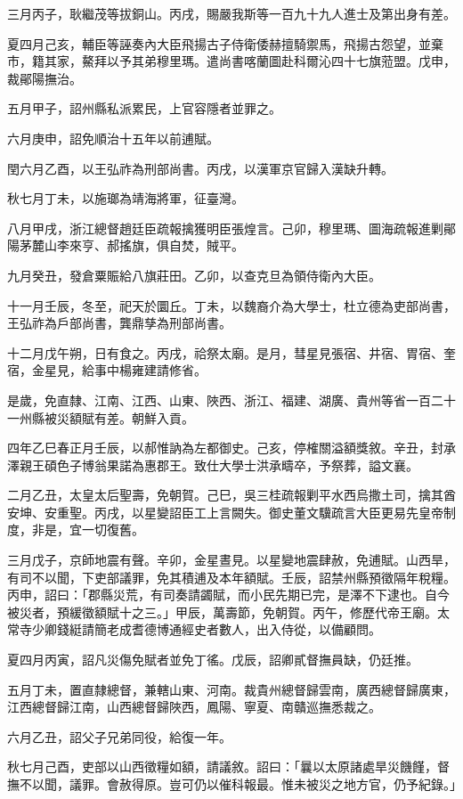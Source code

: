 \begin{pinyinscope}
三月丙子，耿繼茂等拔銅山。丙戌，賜嚴我斯等一百九十九人進士及第出身有差。

夏四月己亥，輔臣等誣奏內大臣飛揚古子侍衛倭赫擅騎禦馬，飛揚古怨望，並棄市，籍其家，鰲拜以予其弟穆里瑪。遣尚書喀蘭圖赴科爾沁四十七旗蒞盟。戊申，裁鄖陽撫治。

五月甲子，詔州縣私派累民，上官容隱者並罪之。

六月庚申，詔免順治十五年以前逋賦。

閏六月乙酉，以王弘祚為刑部尚書。丙戌，以漢軍京官歸入漢缺升轉。

秋七月丁未，以施瑯為靖海將軍，征臺灣。

八月甲戌，浙江總督趙廷臣疏報擒獲明臣張煌言。己卯，穆里瑪、圖海疏報進剿鄖陽茅麓山李來亨、郝搖旗，俱自焚，賊平。

九月癸丑，發倉粟賑給八旗莊田。乙卯，以查克旦為領侍衛內大臣。

十一月壬辰，冬至，祀天於圜丘。丁未，以魏裔介為大學士，杜立德為吏部尚書，王弘祚為戶部尚書，龔鼎孳為刑部尚書。

十二月戊午朔，日有食之。丙戌，祫祭太廟。是月，彗星見張宿、井宿、胃宿、奎宿，金星見，給事中楊雍建請修省。

是歲，免直隸、江南、江西、山東、陜西、浙江、福建、湖廣、貴州等省一百二十一州縣被災額賦有差。朝鮮入貢。

四年乙巳春正月壬辰，以郝惟訥為左都御史。己亥，停榷關溢額獎敘。辛丑，封承澤親王碩色子博翁果諾為惠郡王。致仕大學士洪承疇卒，予祭葬，謚文襄。

二月乙丑，太皇太后聖壽，免朝賀。己巳，吳三桂疏報剿平水西烏撒土司，擒其酋安坤、安重聖。丙戌，以星變詔臣工上言闕失。御史董文驥疏言大臣更易先皇帝制度，非是，宜一切復舊。

三月戊子，京師地震有聲。辛卯，金星晝見。以星變地震肆赦，免逋賦。山西旱，有司不以聞，下吏部議罪，免其積逋及本年額賦。壬辰，詔禁州縣預徵隔年稅糧。丙申，詔曰：「郡縣災荒，有司奏請蠲賦，而小民先期已完，是澤不下逮也。自今被災者，預緩徵額賦十之三。」甲辰，萬壽節，免朝賀。丙午，修歷代帝王廟。太常寺少卿錢綎請簡老成耆德博通經史者數人，出入侍從，以備顧問。

夏四月丙寅，詔凡災傷免賦者並免丁徭。戊辰，詔卿貳督撫員缺，仍廷推。

五月丁未，置直隸總督，兼轄山東、河南。裁貴州總督歸雲南，廣西總督歸廣東，江西總督歸江南，山西總督歸陜西，鳳陽、寧夏、南贛巡撫悉裁之。

六月乙丑，詔父子兄弟同役，給復一年。

秋七月己酉，吏部以山西徵糧如額，請議敘。詔曰：「曩以太原諸處旱災饑饉，督撫不以聞，議罪。會赦得原。豈可仍以催科報最。惟未被災之地方官，仍予紀錄。」


\end{pinyinscope}
